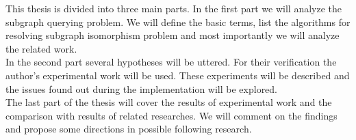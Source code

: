 This thesis is divided into three main parts. In the first part we will analyze the subgraph querying problem. We will define the basic terms, list the algorithms for resolving subgraph isomorphism problem and most importantly we will analyze the related work. \\

In the second part several hypotheses will be uttered. For their verification the author’s experimental work will be used. These experiments will be described and the issues found out during the implementation will be explored.\\

The last part of the thesis will cover the results of experimental work and the comparison with results of related researches. We will comment on the findings and propose some directions in possible following research.
